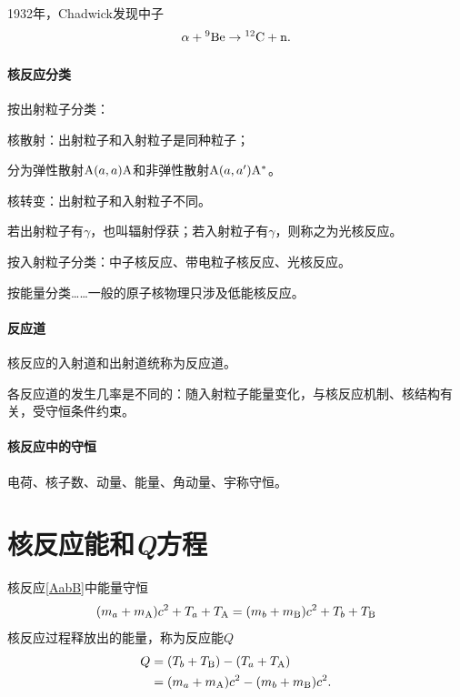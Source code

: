 1932年，Chadwick发现中子
\[
	\alpha + \nuclide9{Be} \to \nuclide{12}C + \neutron.
\]
\paragraph{核反应分类}
按出射粒子分类：
\begin{compactitem}
	\item 核散射：出射粒子和入射粒子是同种粒子；
	
	分为弹性散射$\mathrm{A}(a,a)\mathrm{A}$和非弹性散射$\mathrm{A}(a,a')\mathrm{A^\ast}$。
	\item 核转变：出射粒子和入射粒子不同。
	
	若出射粒子有$\gamma$，也叫辐射俘获；若入射粒子有$\gamma$，则称之为光核反应。
\end{compactitem}
按入射粒子分类：中子核反应、带电粒子核反应、光核反应。

按能量分类……一般的原子核物理只涉及低能核反应。
\paragraph{反应道}核反应的入射道和出射道统称为反应道。

各反应道的发生几率是不同的：随入射粒子能量变化，与核反应机制、核结构有关，受守恒条件约束。

\paragraph{核反应中的守恒}电荷、核子数、动量、能量、角动量、宇称守恒。
\section{核反应能和\textit{Q}方程}
核反应\eqref{AabB}中能量守恒
\[
	(m_a + m_{\mathrm{A}})c^2 + T_a + T_{\mathrm{A}} = (m_b + m_{\mathrm{B}})c^2 + T_b + T_{\mathrm{B}}
\]
核反应过程释放出的能量，称为反应能$Q$
\begin{align}\notag
	Q &= (T_b + T_{\mathrm{B}}) - (T_a + T_{\mathrm{A}})\\
	&= (m_a + m_{\mathrm{A}})c^2 - (m_b + m_{\mathrm{B}})c^2.
\end{align}
